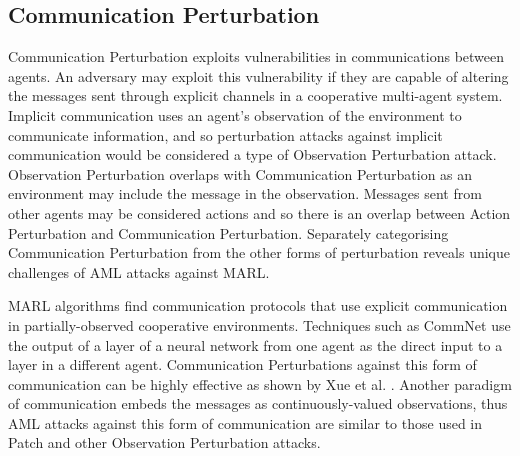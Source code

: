 \documentclass[conference,compsoc]{IEEEtran}
\begin{document}

\subsection{Communication Perturbation}
Communication Perturbation exploits vulnerabilities in communications between agents. An adversary may exploit this vulnerability if they are capable of altering the messages sent through explicit channels in a cooperative multi-agent system. Implicit communication uses an agent's observation of the environment to communicate information, and so perturbation attacks against implicit communication would be considered a type of Observation Perturbation attack. Observation Perturbation overlaps with Communication Perturbation as an environment may include the message in the observation. Messages sent from other agents may be considered actions and so there is an overlap between Action Perturbation and Communication Perturbation. Separately categorising Communication Perturbation from the other forms of perturbation reveals unique challenges of AML attacks against MARL.

MARL algorithms find communication protocols that use explicit communication in partially-observed cooperative environments. Techniques such as CommNet \cite{sukhbaatar_learning_2016} use the output of a layer of a neural network from one agent as the direct input to a layer in a different agent. Communication Perturbations against this form of communication can be highly effective as shown by Xue et al. \cite{xue_mis-spoke_2022}. Another paradigm of communication embeds the messages as continuously-valued observations, thus AML attacks against this form of communication are similar to those used in Patch and other Observation Perturbation attacks. 
\end{document}
